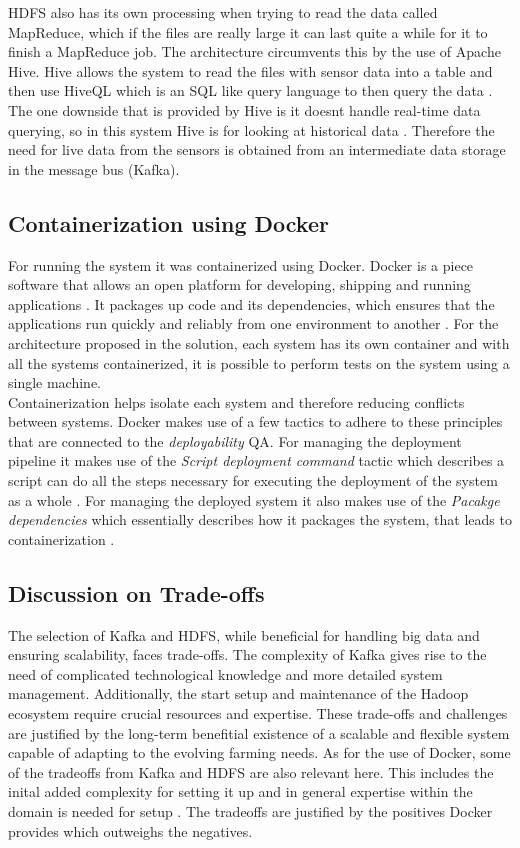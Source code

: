 HDFS also has its own processing when trying to read the data called MapReduce, which if the files are really large it can last quite a while for it to finish a MapReduce job. The architecture circumvents this by the use of Apache Hive. Hive allows the system to read the files with sensor data into a table and then use HiveQL which is an SQL like query language to then query the data \cite{ApacheHive}.
The one downside that is provided by Hive is it doesnt handle real-time data querying, so in this system Hive is for looking at historical data \cite{ApacheHive}. Therefore the need for live data from the sensors is obtained from an intermediate data storage in the message bus (Kafka).

\subsection{\textbf{Containerization using Docker}}
For running the system it was containerized using Docker. Docker is a piece software that allows an open platform for developing, shipping and running applications \cite{Docker2022What}. It packages up code and its dependencies, which ensures that the applications run quickly and reliably from one environment to another \cite{Docker2022What}.
For the architecture proposed in the solution, each system has its own container and with all the systems containerized, it is possible to perform tests on the system using a single machine.\vspace{2mm} \\ Containerization helps isolate each system and therefore reducing conflicts between systems. Docker makes use of a few tactics to adhere to these principles that are connected to the \textit{deployability} QA. For managing the deployment pipeline it makes use of the \textit{Script deployment command} tactic which describes a script can do all the steps necessary for executing the deployment of the system as a whole \cite{Bass2012Software}. For managing the deployed system it also makes use of the \textit{Pacakge dependencies} which essentially describes how it packages the system, that leads to containerization \cite{Bass2012Software}.


\subsection{\textbf{Discussion on Trade-offs}}
The selection of Kafka and HDFS, while beneficial for handling big data and ensuring scalability, faces trade-offs. The complexity of Kafka gives rise to the need of complicated technological knowledge and more detailed system management. Additionally, the start setup and maintenance of the Hadoop ecosystem require crucial resources and expertise. These trade-offs and challenges are justified by the long-term benefitial existence of a scalable and flexible system capable of adapting to the evolving farming needs.
As for the use of Docker, some of the tradeoffs from Kafka and HDFS are also relevant here. This includes the inital added complexity for setting it up and in general expertise within the domain is needed for setup \cite{Gover_2023}. The tradeoffs are justified by the positives Docker provides which outweighs the negatives.